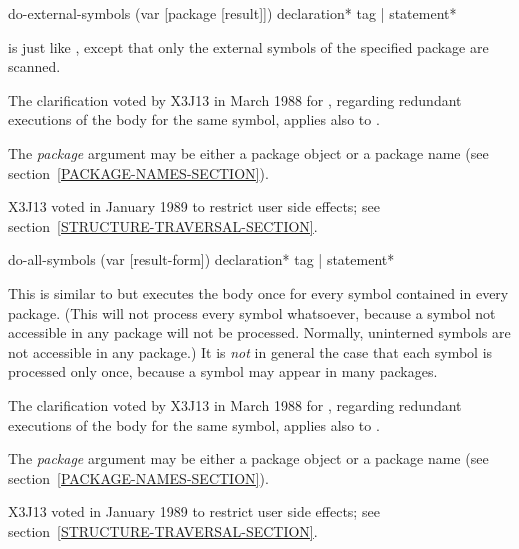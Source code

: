 \begin{defmac}
do-external-symbols (var [package [result]])
                    {declaration}* {tag | statement}*

 is just like , except that only
the external symbols of the specified package are scanned.

\begin{new}
The clarification voted by X3J13
in March 1988 for 
,
regarding redundant executions of the body for the same symbol,
applies also to .
\end{new}

The \emph{package} argument may be either a package object
or a package name (see section~\ref{PACKAGE-NAMES-SECTION}).

\begin{new}
X3J13 voted in January 1989
to restrict user side effects; see section~\ref{STRUCTURE-TRAVERSAL-SECTION}.
\end{new}
\end{defmac}

\begin{defmac}
do-all-symbols (var [result-form])
               {declaration}* {tag | statement}*

This is similar to  but executes the body once for every
symbol contained in every package.  (This will not process every symbol
whatsoever, because a symbol not accessible in any package will not
be processed.  Normally, uninterned symbols are not accessible in any package.)
It is \emph{not} in general
the case that each symbol is processed only once, because a symbol may
appear in many packages.

\begin{new}
The clarification voted by X3J13
in March 1988 for 
,
regarding redundant executions of the body for the same symbol,
applies also to .
\end{new}

The \emph{package} argument may be either a package object
or a package name (see section~\ref{PACKAGE-NAMES-SECTION}).

\begin{new}
X3J13 voted in January 1989
to restrict user side effects; see section~\ref{STRUCTURE-TRAVERSAL-SECTION}.
\end{new}
\end{defmac}

